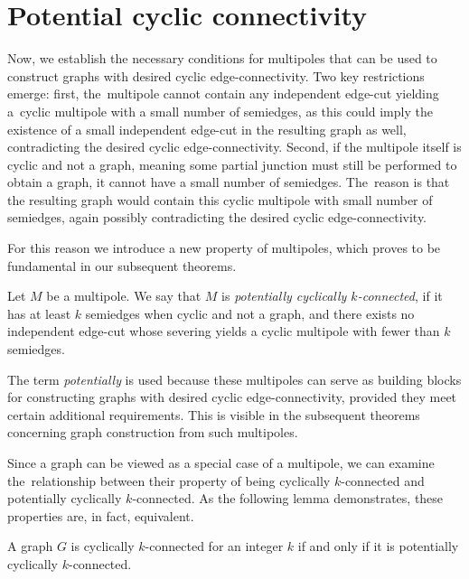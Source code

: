 \documentclass[12pt, twoside]{book}
\begin{document}
\section{Potential cyclic connectivity}\label{sec:potential-cyclic-connectivity}

Now, we establish the necessary conditions for multipoles that can be used to construct graphs with desired cyclic edge-connectivity. Two key restrictions emerge: first, the~multipole cannot contain any independent edge-cut yielding a~cyclic multipole with a small number of semiedges, as this could imply the existence of a small independent edge-cut in the resulting graph as well, contradicting the desired cyclic edge-connectivity. Second, if the multipole itself is cyclic and not a graph, meaning some partial junction must still be performed to obtain a graph, it cannot have a small number of semiedges. The~reason is that the resulting graph would contain this cyclic multipole with small number of semiedges, again possibly contradicting the desired cyclic edge-connectivity.

For this reason we introduce a new property of multipoles, which proves to be fundamental in our subsequent theorems.

\begin{definition}
	Let $M$ be a multipole. We say that $M$ is \textit{potentially cyclically \mbox{$k$-connected}}, if it has at least $k$ semiedges when cyclic and not a graph, and there exists no independent edge-cut whose severing yields a cyclic multipole with fewer than $k$ semiedges.
\end{definition}

The term \textit{potentially} is used because these multipoles can serve as building blocks for constructing graphs with desired cyclic edge-connectivity, provided they meet certain additional requirements. This is visible in the subsequent theorems concerning graph construction from such multipoles.

Since a graph can be viewed as a special case of a multipole, we can examine the~relationship between their property of being cyclically $k$-connected and potentially cyclically $k$-connected. As the following lemma demonstrates, these properties are, in fact, equivalent.

\begin{lemma}\label{lem:graphs-potential-and-normal-cyclic-connected-eq}
	A graph $G$ is cyclically $k$-connected for an integer $k$ if and only if it is potentially cyclically \mbox{$k$-connected}.
\end{lemma}
\end{document}
